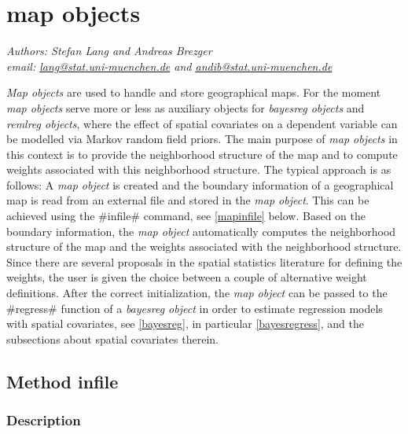 \chapter{map objects}
\label{map} 


{\em Authors: Stefan Lang and Andreas Brezger} \\
{\em email: \href{mailto:lang@stat.uni-muenchen.de}{lang@stat.uni-muenchen.de} and \href{mailto:andib@stat.uni-muenchen.de}{andib@stat.uni-muenchen.de}}\\
\vspace{0.3cm}


{\em Map objects} are used to handle and store geographical maps.
For the moment {\em map objects} serve more or less as auxiliary
objects for {\em bayesreg objects} and {\em remlreg objects},
where the effect of spatial covariates on a dependent variable can
be modelled via Markov random field priors. The main purpose of
{\em map objects} in this context is to provide the neighborhood
structure of the map and to compute weights associated with this
neighborhood structure. The typical approach is as follows: A {\em
map object} is created and the boundary information of a
geographical map is read from an external file and stored in the
{\em map object}. This can be achieved using the #infile# command,
see \autoref{mapinfile} below. Based on the boundary information,
the {\em map object} automatically computes the neighborhood structure
of the map and the weights associated with the neighborhood
structure. Since there are several proposals in the spatial
statistics literature for defining the weights, the user is given
the choice between a couple of alternative weight definitions.
After the correct initialization, the {\em map object} can be
passed to the #regress# function of a {\em bayesreg object} in
order to estimate regression models with spatial covariates, see
\autoref{bayesreg}, in particular \autoref{bayesregress}, and the
subsections about spatial covariates therein.

\section{Method infile}
\label{mapinfile}    
 

\subsection{Description}


